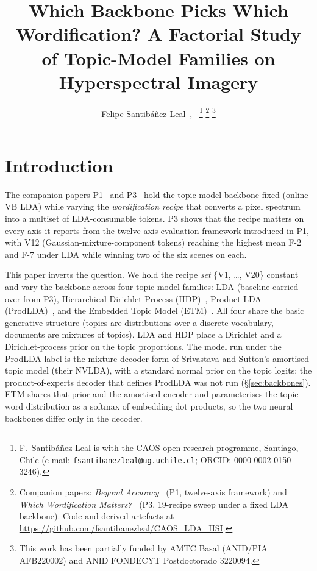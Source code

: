 \documentclass[journal,a4paper,10pt]{IEEEtran}
\title{Which Backbone Picks Which Wordification? A Factorial Study of
Topic-Model Families on Hyperspectral Imagery}
\author{%
  Felipe Santib\'a\~nez-Leal~\orcidlink{0000-0002-0150-3246},~\IEEEmembership{Independent Researcher}%
  \thanks{F.\ Santib\'a\~nez-Leal is with the CAOS open-research
    programme, Santiago, Chile
    (e-mail: \texttt{fsantibanezleal@ug.uchile.cl};
    ORCID: 0000-0002-0150-3246).}%
  \thanks{Companion papers: \emph{Beyond
    Accuracy}~\cite{santibanezleal2026framework} (P1, twelve-axis
    framework) and \emph{Which Wordification
    Matters?}~\cite{santibanezleal2026sweep} (P3, 19-recipe sweep under
    a fixed LDA backbone). Code and derived artefacts at
    \url{https://github.com/fsantibanezleal/CAOS_LDA_HSI}.}%
  \thanks{This work has been partially funded by AMTC Basal
    (ANID/PIA AFB220002) and ANID FONDECYT Postdoctorado 3220094.}%
}
\begin{document}

\maketitle
\IEEEdisplaynontitleabstractindextext
\IEEEpeerreviewmaketitle



\section{Introduction}\label{sec:intro}

The companion papers P1~\cite{santibanezleal2026framework} and
P3~\cite{santibanezleal2026sweep} hold the topic
model backbone fixed (online-VB LDA) while varying the
\emph{wordification recipe} that converts a pixel spectrum into a
multiset of LDA-consumable tokens. P3 shows that the recipe matters
on every axis it reports from the twelve-axis evaluation framework
introduced in P1, with V12 (Gaussian-mixture-component tokens)
reaching the highest mean F-2 and F-7 under LDA while winning two of
the six scenes on each.

This paper inverts the question. We hold the recipe \emph{set}
\{V1, \ldots, V20\} constant and vary the backbone across four
topic-model families: LDA (baseline carried over from P3),
Hierarchical Dirichlet Process (HDP)~\cite{teh2006hdp}, Product LDA
(ProdLDA)~\cite{srivastava2017autoencoding}, and the Embedded Topic
Model (ETM)~\cite{dieng2020topic}. All four share the basic generative
structure (topics are distributions over a discrete vocabulary,
documents are mixtures of topics). LDA and HDP place a Dirichlet and a
Dirichlet-process prior on the topic proportions. The model run under
the ProdLDA label is the mixture-decoder form of Srivastava and
Sutton's amortised topic model (their NVLDA), with a standard normal
prior on the topic logits; the product-of-experts decoder that defines
ProdLDA was not run (\S\ref{sec:backbones}). ETM shares that prior and
the amortised encoder and parameterises the topic--word distribution
as a softmax of embedding dot products, so the two neural backbones
differ only in the decoder.
\end{document}
